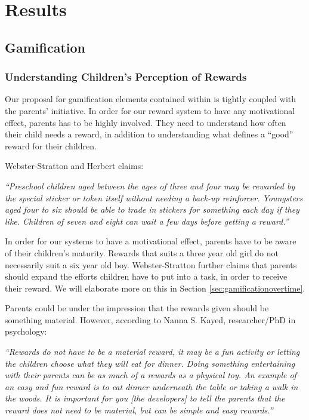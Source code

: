 \chapter{Results}
\label{chp:results}

\section{Gamification}
\label{sec:gamificationresults}

\subsection{Understanding Children's Perception of Rewards}

Our proposal for gamification elements contained within \app{} is tightly coupled with the parents' initiative. In order for our reward system to have any motivational effect, parents has to be highly involved. They need to understand how often their child needs a reward, in addition to understanding what defines a ``good'' reward for their children. 

Webster-Stratton and Herbert claims:

\textit{``Preschool children aged between the ages of three and four may be rewarded by the special sticker or token itself without needing a back-up reinforcer. Youngsters aged four to six should be able to trade in stickers for something each day if they like. Children of seven and eight can wait a few days before getting a reward.''}\cite{webster1994troubled}

In order for our systems to have a motivational effect, parents have to be aware of their children's maturity. Rewards that suits a three year old girl do not necessarily suit a six year old boy. Webster-Stratton further claims that parents should expand the efforts children have to put into a task, in order to receive their reward. We will elaborate more on this in Section \ref{sec:gamificationovertime}. 

Parents could be under the impression that the rewards given should be something material. However, according to Nanna S. Kayed, researcher/PhD in psychology: 

\textit{``Rewards do not have to be a material reward, it may be a fun activity or letting the children choose what they will eat for dinner. Doing something entertaining with their parents can be as much of a rewards as a physical toy. An example of an easy and fun reward is to eat dinner underneath the table or taking a walk in the woods. It is important for you [the developers] to tell the parents that the reward does not need to be material, but can be simple and easy rewards.''}

